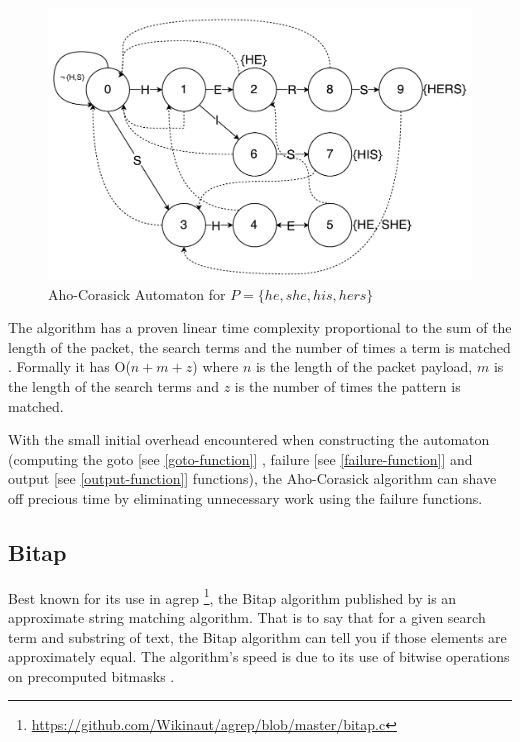 \documentclass{article}
\begin{document}
\begin{figure}[h!bt]
  
  \centering
  \makeatletter
  \includegraphics[width=\textwidth]{images/ac-automaton}
  \caption{Aho-Corasick Automaton for \(P = \{he, she, his, hers\}\)}
  \label{fig:automaton}
\end{figure}

The algorithm has a proven linear time complexity proportional to the sum of the length of the packet, the search terms and the number of times a term is matched \citep{Aho1975}. Formally it has O(\(n + m + z\)) where \(n\) is the length of the packet payload, \(m\) is the length of the search terms and \(z\) is the number of times the pattern is matched.

With the small initial overhead encountered when constructing the automaton (computing the goto [see \ref{goto-function}] , failure [see \ref{failure-function}] and output [see \ref{output-function}] functions), the Aho-Corasick algorithm can shave off precious time by eliminating unnecessary work using the failure functions.

\subsection{Bitap}

Best known for its use in agrep \citep{Wu1992}\footnote{\url{https://github.com/Wikinaut/agrep/blob/master/bitap.c}}, the Bitap algorithm published by \cite{Baeza1992} is an approximate string matching algorithm. That is to say that for a given search term and substring of text, the Bitap algorithm can tell you if those elements are approximately equal. The algorithm's speed is due to its use of bitwise operations on precomputed bitmasks .
\end{document}
